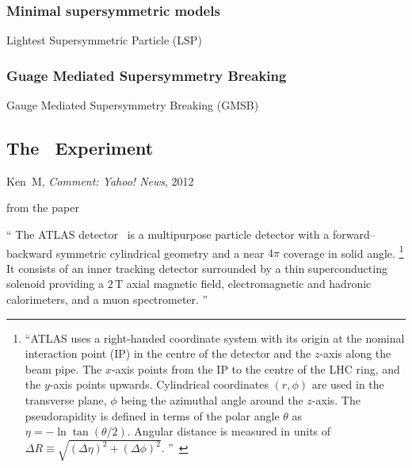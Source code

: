 \subsubsection{Minimal supersymmetric models}
Lightest Supersymmetric Particle (LSP)


\subsubsection{Guage Mediated Supersymmetry Breaking}
Gauge Mediated Supersymmetry Breaking (GMSB)



\begin{singlespacing}
\section{The \atlas\ Experiment}
%
\begin{epigraphs}
%
{Ken~M,
\textit{Comment: Yahoo! News},
2012~\cite{kenm2012inner}}
\end{epigraphs}
\end{singlespacing}


from the paper~\cite{atlas2022searches}

\begin{displayquote}
``%
The ATLAS detector~\cite{PERF-2007-01} is a multipurpose particle detector with
a forward--backward symmetric cylindrical geometry and a near $4\pi$ coverage
in solid angle.%
\footnote{%
``ATLAS uses a right-handed coordinate system with its origin at the nominal
interaction point (IP) in the centre of the detector and the $z$-axis along the
beam pipe.
The $x$-axis points from the IP to the centre of the LHC ring, and the $y$-axis
points upwards.
Cylindrical coordinates $(r,\phi)$ are used in the transverse plane, $\phi$
being the azimuthal angle around the $z$-axis.
The pseudorapidity is defined in terms of the polar angle $\theta$ as
$\eta = -\ln \tan(\theta/2)$.
Angular distance is measured in units of
$\Delta R \equiv \sqrt{(\Delta\eta)^{2} + (\Delta\phi)^{2}}$.%
''~\cite{atlas2022searches}
}
It consists of an inner tracking detector surrounded by a thin superconducting
solenoid providing a $2\,\mathrm{T}$ axial magnetic field, electromagnetic and
hadronic calorimeters, and a muon spectrometer.%
''~\cite{atlas2022searches}
\end{displayquote}


